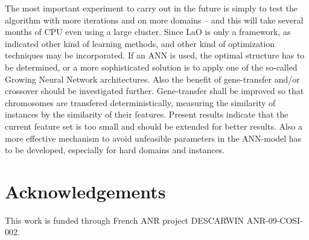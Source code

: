 \documentclass[runningheads,a4paper]{llncs}
\begin{document}
The most important experiment to carry out in the future is simply to test the algorithm with more iterations and on more domains -- and this will take several months of CPU even using a large cluster. Since LaO is only a framework, as indicated other kind of learning methods, and other kind of optimization techniques may be incorporated. If an ANN is used, the optimal structure has to be determined, or a more sophisticated solution is to apply one of the so-called Growing Neural Network architectures. Also the benefit of gene-transfer and/or crossover should be investigated further. Gene-transfer shall be improved so that chromosomes are transfered deterministically, measuring the similarity of instances by the similarity of their features. Present results indicate that the current feature set is too small and should be extended for better results. Also a more effective mechanism to avoid unfeasible parameters in the ANN-model has to be developed, especially for hard domains and instances.


\section{Acknowledgements}
This work is funded through French ANR project DESCARWIN ANR-09-COSI-002.




\end{document}
